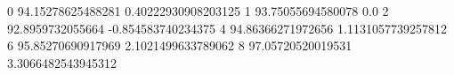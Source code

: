 0 94.15278625488281 0.40222930908203125
1 93.75055694580078 0.0
2 92.8959732055664 -0.854583740234375
4 94.86366271972656 1.1131057739257812
6 95.85270690917969 2.1021499633789062
8 97.05720520019531 3.3066482543945312
